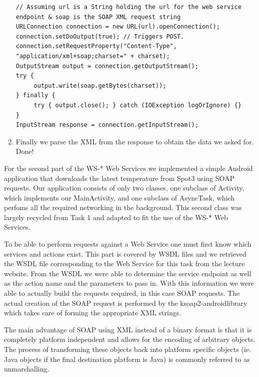 \documentclass{report}
\begin{document}
\begin{enumerate}
	\begin{lstlisting}
// Assuming url is a String holding the url for the web service endpoint & soap is the SOAP XML request string
URLConnection connection = new URL(url).openConnection();
connection.setDoOutput(true); // Triggers POST.
connection.setRequestProperty("Content-Type", "application/xml+soap;charset=" + charset);
OutputStream output = connection.getOutputStream();
try {
     output.write(soap.getBytes(charset));
} finally {
     try { output.close(); } catch (IOException logOrIgnore) {}
}
InputStream response = connection.getInputStream();
	\end{lstlisting}
	\item Finally we parse the XML from the response to obtain the data we asked for. Done!
\end{enumerate}


For the second part of the WS\hbox{-}* Web Services we implemented a simple Android application that downloads the latest temperature from Spot3 using SOAP requests. Our application consists of only two classes, one subclass of Activity, which implements our MainActivity, and one subclass of AsyncTask, which perfoms all the required networking in the background. This second class was largely recycled from Task 1 and adapted to fit the use of the WS\hbox{-}* Web Services.

To be able to perform requests against a Web Service one must first know which services and actions exist. This part is covered by WSDL files and we retrieved the WSDL file corresponding to the Web Service for this task from the lecture website. From the WSDL we were able to determine the service endpoint as well as the action name and the parameters to pass in. With this information we were able to actually build the requests required, in this case SOAP requests. The actual creation of the SOAP request is performed by the ksoap2-androidlibrary\cite{ksoap2} which takes care of forming the appropriate XML strings.

The main advantage of SOAP using XML instead of a binary format is that it is completely platform independent and allows for the encoding of arbitrary objects. The process of transforming these objects back into platform specific objects (ie. Java objects if the final destination platform is Java) is commonly referred to as unmarshalling.
\end{document}
